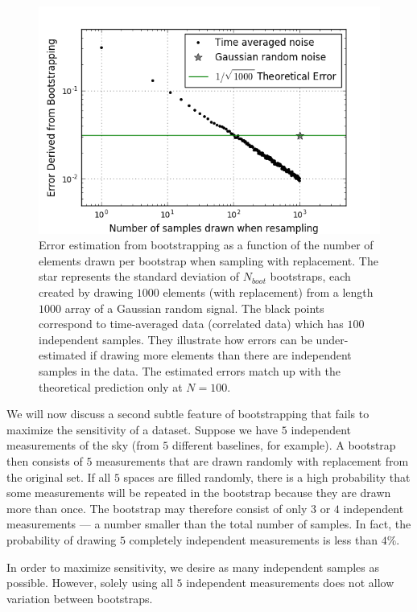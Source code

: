 \documentclass[preprint2,numberedappendix,tighten]{aastex6}  %
\begin{document}
\begin{figure}
	\centering
	\includegraphics[trim={0.3cm 0cm 0.3cm 0.3cm},width=\columnwidth]{plots/toy_error1.png}
	\caption{Error estimation from bootstrapping as a function of the number of elements drawn per bootstrap when 
sampling with replacement. The star represents the standard deviation of $N_{boot}$ bootstraps, each created by drawing $1000$ 
elements (with replacement) from a length $1000$ array of a Gaussian random signal. The black points correspond to time-averaged data (correlated data) which has $100$ independent samples. They illustrate how errors can be under-estimated if 
drawing more elements than there are independent samples in the data. The estimated errors match up with the theoretical 
prediction only at $N=100$.}
	\label{fig:toy_error1}
\end{figure}

We will now discuss a second subtle feature of bootstrapping that fails to maximize the sensitivity of a dataset. Suppose we 
have $5$ independent measurements of the sky (from $5$ different baselines, for example). A bootstrap then consists of $5$ 
measurements that are drawn randomly with replacement from the original set. If all $5$ spaces are filled randomly, there is a 
high probability that some measurements will be repeated in the bootstrap because they are drawn more than once. The 
bootstrap may therefore consist of only $3$ or $4$ independent measurements --- a number smaller than the total number of 
samples. In fact, the probability of drawing $5$ completely independent measurements is less than $4\%$.

In order to maximize sensitivity, we desire as many independent samples as possible. However, solely using all $5$ 
independent measurements does not allow variation between bootstraps. 
\end{document}
